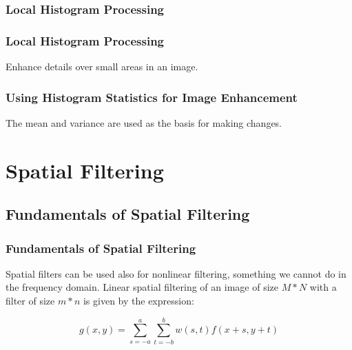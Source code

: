 \documentclass[notheorems, serif, table, compress]{beamer}  %
\begin{document}
\subsubsection{Local Histogram Processing}%
\begin{frame}
\frametitle{Local Histogram Processing}
Enhance details over small areas in an image.%

\end{frame}
\begin{frame}
\frametitle{Using Histogram Statistics for Image Enhancement}%

 
 The  mean and variance are used as the basis for making changes.


 
\end{frame}
\section{Spatial Filtering}%
\subsection{Fundamentals of Spatial Filtering}
\begin{frame}
\frametitle{Fundamentals of Spatial Filtering}
 Spatial filters can be used also for nonlinear filtering, something we cannot do in the frequency domain.
 Linear spatial filtering of an image of size $M*N$ with a filter of size $m*n$ is given by the expression:


\begin{equation} \label {3.13}
g(x, y)=\sum_{s=-a}^{a}\sum_{t=-b}^{b}w(s, t)f(x+s, y+t)
\end{equation}
 \end{frame}
\end{document}
